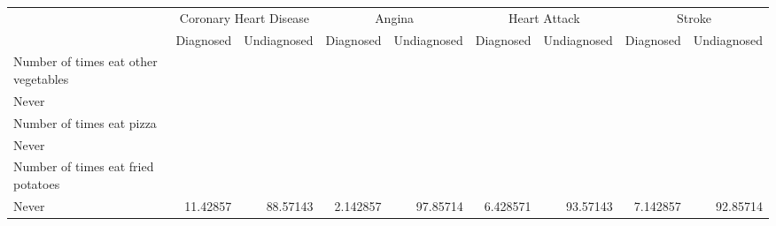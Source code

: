 \documentclass{article}
\begin{document}
\begin{tabular}{lllllllll}
\cline{1-9}
\multicolumn{1}{c}{} &
  \multicolumn{2}{|c}{Coronary Heart Disease} &
  \multicolumn{2}{c}{Angina} &
  \multicolumn{2}{c}{Heart Attack} &
  \multicolumn{2}{c}{Stroke} \\
\multicolumn{1}{c}{} &
  \multicolumn{1}{|r}{Diagnosed} &
  \multicolumn{1}{r}{Undiagnosed} &
  \multicolumn{1}{r}{Diagnosed} &
  \multicolumn{1}{r}{Undiagnosed} &
  \multicolumn{1}{r}{Diagnosed} &
  \multicolumn{1}{r}{Undiagnosed} &
  \multicolumn{1}{r}{Diagnosed} &
  \multicolumn{1}{r}{Undiagnosed} \\
\cline{1-9}
\multicolumn{1}{l}{Number of times eat other vegetables} &
  \multicolumn{1}{|r}{} &
  \multicolumn{1}{r}{} &
  \multicolumn{1}{r}{} &
  \multicolumn{1}{r}{} &
  \multicolumn{1}{r}{} &
  \multicolumn{1}{r}{} &
  \multicolumn{1}{r}{} &
  \multicolumn{1}{r}{} \\
\multicolumn{1}{l}{\hspace{1em}Never} &
  \multicolumn{1}{|r}{} &
  \multicolumn{1}{r}{} &
  \multicolumn{1}{r}{} &
  \multicolumn{1}{r}{} &
  \multicolumn{1}{r}{} &
  \multicolumn{1}{r}{} &
  \multicolumn{1}{r}{} &
  \multicolumn{1}{r}{} \\
\multicolumn{1}{l}{\hspace{2em}Number of times eat pizza} &
  \multicolumn{1}{|r}{} &
  \multicolumn{1}{r}{} &
  \multicolumn{1}{r}{} &
  \multicolumn{1}{r}{} &
  \multicolumn{1}{r}{} &
  \multicolumn{1}{r}{} &
  \multicolumn{1}{r}{} &
  \multicolumn{1}{r}{} \\
\multicolumn{1}{l}{\hspace{3em}Never} &
  \multicolumn{1}{|r}{} &
  \multicolumn{1}{r}{} &
  \multicolumn{1}{r}{} &
  \multicolumn{1}{r}{} &
  \multicolumn{1}{r}{} &
  \multicolumn{1}{r}{} &
  \multicolumn{1}{r}{} &
  \multicolumn{1}{r}{} \\
\multicolumn{1}{l}{\hspace{4em}Number of times eat fried potatoes} &
  \multicolumn{1}{|r}{} &
  \multicolumn{1}{r}{} &
  \multicolumn{1}{r}{} &
  \multicolumn{1}{r}{} &
  \multicolumn{1}{r}{} &
  \multicolumn{1}{r}{} &
  \multicolumn{1}{r}{} &
  \multicolumn{1}{r}{} \\
\multicolumn{1}{l}{\hspace{5em}Never} &
  \multicolumn{1}{|r}{11.42857} &
  \multicolumn{1}{r}{88.57143} &
  \multicolumn{1}{r}{2.142857} &
  \multicolumn{1}{r}{97.85714} &
  \multicolumn{1}{r}{6.428571} &
  \multicolumn{1}{r}{93.57143} &
  \multicolumn{1}{r}{7.142857} &
  \multicolumn{1}{r}{92.85714} \\

\end{tabular}
\end{document}
